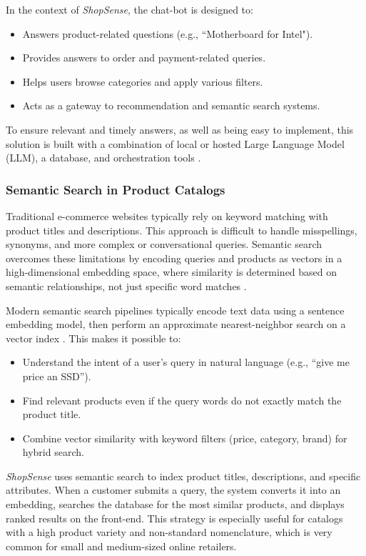 In the context of \textit{ShopSense}, the chat-bot is designed to: 
\begin{itemize}
  \item Answers product-related questions (e.g., “Motherboard for Intel").
  \item Provides answers to order and payment-related queries.
  \item Helps users browse categories and apply various filters.
  \item Acts as a gateway to recommendation and semantic search systems.
\end{itemize}
To ensure relevant and timely answers, as well as being easy to implement, this solution is built with a combination of local or hosted Large Language Model (LLM), a database, and orchestration tools \cite{lewis2020retrieval}.

\subsubsection{Semantic Search in Product Catalogs}
Traditional e-commerce websites typically rely on keyword matching with product titles and descriptions. This approach is difficult to handle misspellings, synonyms, and more complex or conversational queries. Semantic search overcomes these limitations by encoding queries and products as vectors in a high-dimensional embedding space, where similarity is determined based on semantic relationships, not just specific word matches \cite{reimers2019sentence}.

Modern semantic search pipelines typically encode text data using a sentence embedding model, then perform an approximate nearest-neighbor search on a vector index \cite{reimers2019sentence}. This makes it possible to:

\begin{itemize}
  \item Understand the intent of a user’s query in natural language (e.g., “give me price an SSD”).
  \item Find relevant products even if the query words do not exactly match the product title.
  \item Combine vector similarity with keyword filters (price, category, brand) for hybrid search.
\end{itemize}
\textit{ShopSense} uses semantic search to index product titles, descriptions, and specific attributes. When a customer submits a query, the system converts it into an embedding, searches the database for the most similar products, and displays ranked results on the front-end. This strategy is especially useful for catalogs with a high product variety and non-standard nomenclature, which is very common for small and medium-sized online retailers.


